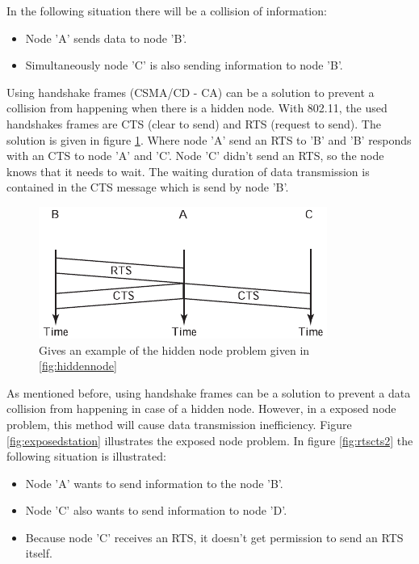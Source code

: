 \documentclass[10pt,a4paper]{article}
\begin{document}
In the following situation there will be a collision of information:
\begin{itemize}
\setlength\itemsep{0em}
\item Node 'A' sends data to node 'B'.
\item Simultaneously node 'C' is also sending information to node 'B'.
\end{itemize}

Using handshake frames (CSMA/CD - CA) can be a solution to prevent a collision from happening when there is a hidden node. With 802.11, the used handshakes frames are CTS (clear to send) and RTS (request to send). The solution is given in figure \ref{fig:rtscts}. Where node 'A' send an RTS to 'B' and 'B' responds with an CTS to node 'A' and 'C'. Node 'C' didn't send an RTS, so the node knows that it needs to wait. The waiting duration of data transmission is contained in the CTS message which is send by node 'B'. \cite{tcipbook}

\begin{figure}[H]
   \centering
   \includegraphics[width=.75\textwidth]{rtscts}
   \caption{Gives an example of the hidden node problem given in \ref{fig:hiddennode}}
   \label{fig:rtscts}
\end{figure}

As mentioned before, using handshake frames can be a solution to prevent a data collision from happening in case of a hidden node. However, in a exposed node problem, this method will cause data transmission inefficiency. \cite{tcipbook} Figure \ref{fig:exposedstation} illustrates the exposed node problem. In figure \ref{fig:rtscts2} the following situation is illustrated:

\begin{itemize}
\setlength\itemsep{0em}
\item Node 'A' wants to send information to the node 'B'.
\item Node 'C' also wants to send information to node 'D'.
\item Because node 'C' receives an RTS, it doesn't get permission to send an RTS itself.
\end{itemize}
\end{document}
